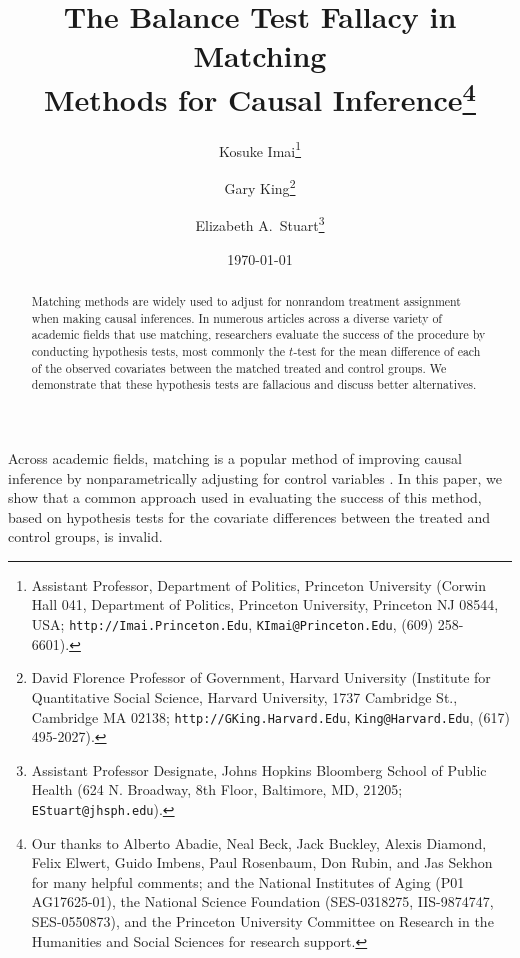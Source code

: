 \documentclass[11pt,titlepage]{article}
\title{The Balance Test Fallacy in Matching\\ Methods for Causal
  Inference\thanks{Our thanks to Alberto Abadie, Neal Beck, Jack
    Buckley, Alexis Diamond, Felix Elwert, Guido Imbens, Paul
    Rosenbaum, Don Rubin, and Jas Sekhon for many helpful comments;
    and the National Institutes of Aging (P01 AG17625-01), the
    National Science Foundation (SES-0318275, IIS-9874747,
    SES-0550873), and the Princeton University Committee on Research
    in the Humanities and Social Sciences for research support.}}
\author{Kosuke Imai\thanks{Assistant Professor, Department of
    Politics, Princeton University (Corwin Hall 041, Department of
    Politics, Princeton University, Princeton NJ 08544, USA;
    \texttt{http://Imai.Princeton.Edu}, \texttt{KImai@Princeton.Edu},
    (609) 258-6601).}
\and 
  Gary King\thanks{David Florence Professor of Government, Harvard
    University (Institute for Quantitative Social Science, Harvard
    University, 1737 Cambridge St., Cambridge MA 02138;
    \texttt{http://GKing.Harvard.Edu}, \texttt{King@Harvard.Edu},
    (617) 495-2027).}
\and 
  Elizabeth A.\ Stuart\thanks{Assistant Professor Designate, Johns Hopkins Bloomberg School
    of Public Health  (624 N. Broadway, 8th Floor, Baltimore, MD, 21205; 
    \texttt{EStuart@jhsph.edu}).}}
\date{\today}
\begin{document}
\maketitle

\begin{abstract}
  Matching methods are widely used to adjust for nonrandom treatment
  assignment when making causal inferences.  In numerous articles
  across a diverse variety of academic fields that use matching,
  researchers evaluate the success of the procedure by conducting
  hypothesis tests, most commonly the $t$-test for the mean difference
  of each of the observed covariates between the matched treated and
  control groups. We demonstrate that these hypothesis tests are
  fallacious and discuss better alternatives.
\end{abstract}

Across academic fields, matching is a popular method of improving
causal inference by nonparametrically adjusting for control variables
\citep{Imbens04,Rosenbaum02,Rubin06}.  In this paper, we show that a
common approach used in evaluating the success of this method, based
on hypothesis tests for the covariate differences between the treated
and control groups, is invalid.
\end{document}
